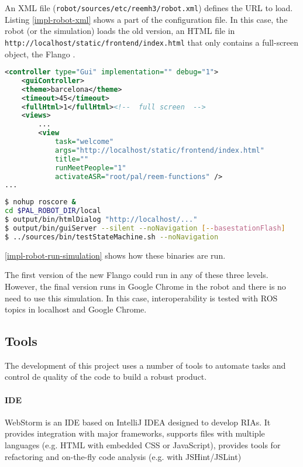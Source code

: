 An \ac{XML} file (\texttt{robot/sources/etc/reemh3/robot.xml}) defines the \ac{URL} to load.
Listing \ref{impl-robot-xml} shows a part of the configuration file.
In this case, the robot (or the simulation) loads the old version, an \ac{HTML} file in \texttt{http://localhost/static/frontend/index.html} that only contains a full-screen \flash object, the Flango \cm .
\begin{lstlisting}[language=xml,caption=Robot configuration file, label=impl-robot-xml]
<controller type="Gui" implementation="" debug="1">
    <guiController>
    <theme>barcelona</theme>
    <timeout>45</timeout>
    <fullHtml>1</fullHtml><!--  full screen  -->
    <views>
        ...
        <view
            task="welcome" 
            args="http://localhost/static/frontend/index.html" 
            title="" 
            runMeetPeople="1"  
            activateASR="root/pal/reem-functions" />
...    
\end{lstlisting}

\begin{lstlisting}[language=bash,caption=Execution of a robot simulation, label=impl-robot-run-simulation]
$ nohup roscore &
cd $PAL_ROBOT_DIR/local
$ output/bin/htmlDialog "http://localhost/..."
$ output/bin/guiServer --silent --noNavigation [--basestationFlash]
$ ../sources/bin/testStateMachine.sh --noNavigation
\end{lstlisting}

\ref{impl-robot-run-simulation} shows how these binaries are run.

The first version of the new Flango \cm could run in any of these three levels.
However, the final version runs in Google Chrome in the robot and there is no need to use this simulation.
In this case, interoperability is tested with \ac{ROS} topics in localhost and Google Chrome.

\subsection*{Tools}
The development of this project uses a number of tools to automate tasks and control de quality of the code to build a robust product.

\paragraph{\ac{IDE}} WebStorm is an \ac{IDE} based on IntelliJ IDEA designed to develop \acp{RIA}.
It provides integration with major frameworks, supports files with multiple languages (e.g. HTML with embedded \ac{CSS} or JavaScript), provides tools for refactoring and on-the-fly code analysis (e.g. with JSHint/JSLint)

